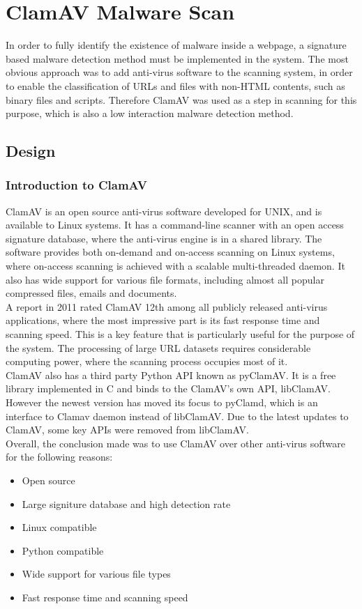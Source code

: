 
\section{ClamAV Malware Scan}
In order to fully identify the existence of malware inside a webpage, a 
signature based malware detection method must be implemented in the system. 
The most obvious approach was to add anti-virus software to the scanning system, 
in order to enable the classification of URLs and files with non-HTML contents, such 
as binary files and scripts. Therefore ClamAV was used as a step in scanning for this purpose, which is also a low interaction malware detection 
method.

\subsection{Design}
\subsubsection{Introduction to ClamAV}
ClamAV is an open source anti-virus software developed for UNIX, and is 
available to Linux systems. It has a command-line scanner with an open access 
signature database, where the anti-virus engine is in a shared library. 
The software provides both on-demand and on-access scanning on Linux systems, 
where on-access scanning is achieved with a scalable multi-threaded daemon. 
It also has wide support for various file formats, including almost all 
popular compressed files, emails and documents. \\
A report in 2011 rated ClamAV 12th among all publicly released anti-virus 
applications,\cite{shandowserver} where the most impressive part is its fast 
response time and scanning speed. This is a key feature that is particularly useful for the purpose of the system. The processing of large URL
datasets requires considerable computing power, where the scanning process 
occupies most of it. \\
ClamAV also has a third party Python API known as pyClamAV. It is a free 
library implemented in C and binds to the ClamAV's own API, libClamAV. However 
the newest version has moved its focus to pyClamd, which is an interface to Clamav 
daemon instead of libClamAV. Due to the latest updates to ClamAV, some 
key APIs were removed from libClamAV. \\
Overall, the conclusion made was to use ClamAV over other 
anti-virus software for the following reasons: 
\begin{itemize}
\item Open source
\item Large signiture database and high detection rate
\item Linux compatible
\item Python compatible
\item Wide support for various file types
\item Fast response time and scanning speed
\end{itemize}

